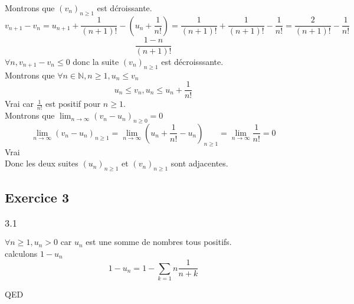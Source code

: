 \documentclass[]{book}
\theoremstyle{definition}
\newcommand{\bb}[1]{\mathbb{#1}}
\newcommand{\N}{\bb{N}}
\begin{document}
Montrons que $(v_n)_{n\geq1}$ est d\'croissante. 
$$v_{n+1} - v_{n} = u_{n+1}+\frac{1}{(n+1)!} - (u_{n}+\frac{1}{n!}) = \frac{1}{(n+1)!} + \frac{1}{(n+1)!} - \frac{1}{n!} = \frac{2}{(n+1)!} - \frac{1}{n!}$$
$$\frac{1-n}{(n+1)!} $$
$\forall n, v_{n+1} - v_{n} \leq 0$ donc la suite $(v_n)_{n\geq1}$ est d\'ecroisssante.\\

Montrons que $\forall n \in \N, n \geq 1, u_n \leq v_n$
$$u_n \leq v_n, u_n \leq u_n + \frac{1}{n!}$$
Vrai car $\frac{1}{n!}$ est positif pour $n \geq 1$.\\

Montrons que $\lim_{n \to \infty}(v_n-u_n)_{n\geq0} = 0$
$$\lim_{n \to \infty}(v_n-u_n)_{n\geq1} = \lim_{n \to \infty}(u_n+\frac{1}{n!}-u_n)_{n\geq1} = \lim_{n \to \infty}\frac{1}{n!} = 0$$
Vrai\\

Donc les deux suites $(u_n)_{n\geq1}$ et $(v_n)_{n\geq1}$ sont adjacentes.


\subsection*{Exercice 3}
\subsubsection*{$3.1$}
$\forall n\geq 1, u_n > 0$ car $u_n$ est une somme de nombres tous positifs.\\
calculons $1 - u_n$
$$1-u_n= 1 - \sum_{k=1}{n} {\frac{1}{n+k}}$$


QED
\end{document}
